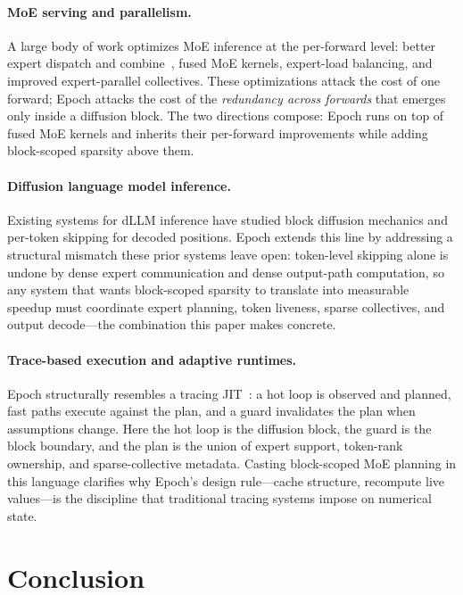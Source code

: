 \documentclass[sigconf,review,anonymous, 10pt]{acmart}
\newcommand{\sys}{Epoch}
\begin{document}
\paragraph{MoE serving and parallelism.}
A large body of work optimizes MoE inference at the per-forward level: better expert dispatch and combine~\cite{moe}, fused MoE kernels, expert-load balancing, and improved expert-parallel collectives.
These optimizations attack the cost of one forward; \sys{} attacks the cost of the \emph{redundancy across forwards} that emerges only inside a diffusion block.
The two directions compose: \sys{} runs on top of fused MoE kernels and inherits their per-forward improvements while adding block-scoped sparsity above them.

\paragraph{Diffusion language model inference.}
Existing systems for dLLM inference have studied block diffusion mechanics and per-token skipping for decoded positions.
\sys{} extends this line by addressing a structural mismatch these prior systems leave open: token-level skipping alone is undone by dense expert communication and dense output-path computation, so any system that wants block-scoped sparsity to translate into measurable speedup must coordinate expert planning, token liveness, sparse collectives, and output decode---the combination this paper makes concrete.

\paragraph{Trace-based execution and adaptive runtimes.}
\sys{} structurally resembles a tracing JIT~\cite{flashattention}: a hot loop is observed and planned, fast paths execute against the plan, and a guard invalidates the plan when assumptions change.
Here the hot loop is the diffusion block, the guard is the block boundary, and the plan is the union of expert support, token-rank ownership, and sparse-collective metadata.
Casting block-scoped MoE planning in this language clarifies why \sys{}'s design rule---cache structure, recompute live values---is the discipline that traditional tracing systems impose on numerical state.


\section{Conclusion}
\end{document}
